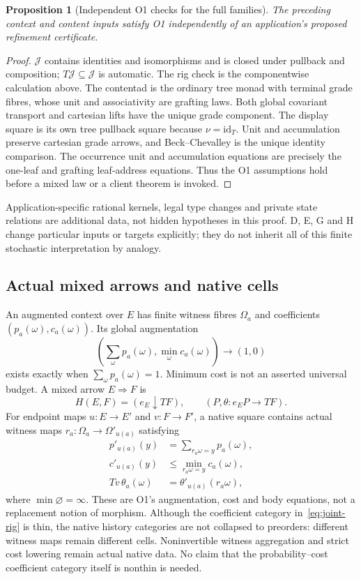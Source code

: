 \documentclass[11pt,a4paper]{article}
\newtheorem{proposition}[theorem]{Proposition}
\theoremstyle{definition}
\newcommand{\id}{\mathrm{id}}
\begin{document}
\begin{proposition}[Independent O1 checks for the full families]
The preceding context and content inputs satisfy O1 independently of an
application's proposed refinement certificate.
\end{proposition}
\begin{proof}
$\mathcal J$ contains identities and isomorphisms and is closed under
pullback and composition; $T\mathcal J\subseteq\mathcal J$ is automatic.
The rig check is the componentwise calculation above. The contentad is
the ordinary tree monad with terminal grade fibres, whose unit and
associativity are grafting laws. Both global covariant transport and
cartesian lifts have the unique grade component. The display square is
its own tree pullback square because $\nu=\id_T$. Unit and accumulation
preserve cartesian grade arrows, and Beck--Chevalley is the unique
identity comparison. The occurrence unit and accumulation equations are
precisely the one-leaf and grafting leaf-address equations. Thus the
O1 assumptions hold before a mixed law or a client theorem is invoked.
\end{proof}
Application-specific rational kernels, legal type changes and private
state relations are additional data, not hidden hypotheses in this proof.
D, E, G and H change particular inputs or targets explicitly; they do not
inherit all of this finite stochastic interpretation by analogy.

\subsection{Actual mixed arrows and native cells}\label{sec:core-cells}
An augmented context over $E$ has finite witness fibres $\Omega_a$ and
coefficients $(p_a(\omega),c_a(\omega))$. Its global augmentation
\[
\left(\sum_{\omega}p_a(\omega),\min_{\omega}c_a(\omega)\right)
\longrightarrow(1,0)
\]
exists exactly when $\sum_\omega p_a(\omega)=1$. Minimum cost is not
an asserted universal budget. A mixed arrow $E\Rightarrow F$ is
\[
H(E,F)=(e_E\downarrow TF),\qquad
(P,\theta:e_EP\longrightarrow TF).
\]
For endpoint maps $u:E\to E'$ and $v:F\to F'$, a native square contains
actual witness maps $r_a:\Omega_a\to\Omega'_{u(a)}$ satisfying
\begin{equation}\label{eq:native-square}
\begin{split}
p'_{u(a)}(y)&=\sum_{r_a\omega=y}p_a(\omega),\\
c'_{u(a)}(y)&\leq\min_{r_a\omega=y}c_a(\omega),\\
Tv\,\theta_a(\omega)&=\theta'_{u(a)}(r_a\omega),
\end{split}
\end{equation}
where $\min\varnothing=\infty$. These are O1's augmentation, cost and
body equations, not a replacement notion of morphism. Although the
coefficient category in~\eqref{eq:joint-rig} is thin, the native history
categories are not collapsed to preorders: different witness maps remain
different cells. Noninvertible witness aggregation and strict cost
lowering remain actual native data. No claim that the probability--cost
coefficient category itself is nonthin is needed.
\end{document}
